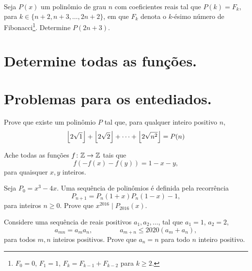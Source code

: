 \documentclass[10pt,a4paper]{article}
\begin{document}
	\begin{prob}[$P(k) = F_k$, $P(2n+3) =\ ?$]\label{P(k)=F_k}
	Seja $P(x)$ um polinômio de grau $n$ com coeficientes reais tal que $P(k) = F_k$, para $k \in \{n+2, n+3, \dots, 2n+2\}$, em que $F_k$ denota o $k$-ésimo número de Fibonacci\footnote{$F_0 = 0$, $F_1 = 1$, $F_{k} = F_{k-1} + F_{k-2}$ para $k \ge 2$.}. Determine $P(2n+3)$.
	\end{prob}

	\newpage
	\section*{Determine todas as funções.}


	\section*{Problemas para os entediados.}

	\begin{prob}
		Prove que existe um polinômio $P$ tal que, para qualquer inteiro positivo $n$, \[
			\left \lfloor{2\sqrt{1}}\right \rfloor + \left \lfloor{2\sqrt{2}}\right \rfloor + \dots + \left \lfloor{2\sqrt{n^2}}\right \rfloor = P(n)
		\]
	\end{prob}


	\begin{prob}
		Ache todas as funções $f \colon \mathbb{Z} \to \mathbb{Z}$ tais que  \[ f( - f(x) - f(y) ) = 1 - x - y, \]para quaisquer $x, y$ inteiros.
	\end{prob}

	\begin{prob}
		Seja $P_0 = x^3 - 4x$. Uma sequência de polinômios é definida pela recorrência \[  P_{n+1} = P_n(1+x)P_n(1-x) - 1, \]
		para inteiros $n \ge 0$. Prove que $x^{2016} \mid P_{2016}(x)$.
	\end{prob}

	\begin{prob}
		Considere uma sequência de reais positivos $a_1, a_2, \dots$, tal que $a_1 = 1$, $a_2 = 2$,  \[
			a_{mn} = a_ma_n, \qquad \qquad a_{m+n} \le 2020(a_m + a_n),
		\]
			para todos $m, n$ inteiros positivos. Prove que $a_n = n$ para todo $n$ inteiro positivo.
	\end{prob}

	\newpage
	
\end{document}
